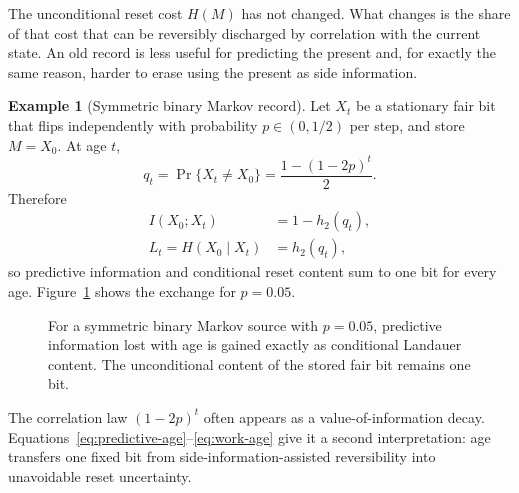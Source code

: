 \documentclass[letterpaper,onecolumn]{IEEEtran}
\theoremstyle{definition}
\newtheorem{example}{Example}
\theoremstyle{remark}
\newcommand{\1}{\mathbf{1}}
\newcommand{\hbin}{h_2}
\begin{document}
The unconditional reset cost $H(M)$ has not changed. What changes is the share
of that cost that can be reversibly discharged by correlation with the current
state. An old record is less useful for predicting the present and, for exactly
the same reason, harder to erase using the present as side information.

\begin{example}[Symmetric binary Markov record]\label{ex:markov}
Let $X_t$ be a stationary fair bit that flips independently with probability
$p\in(0,1/2)$ per step, and store $M=X_0$. At age $t$,
\begin{equation}
 q_t=\Pr\{X_t\ne X_0\}
 =\frac{1-(1-2p)^t}{2}.
 \label{eq:q-age}
\end{equation}
Therefore
\begin{align}
 I(X_0;X_t)&=1-\hbin(q_t),\label{eq:predictive-age}\\
 L_t=H(X_0\mid X_t)&=\hbin(q_t),\label{eq:work-age}
\end{align}
so predictive information and conditional reset content sum to one bit for
every age. Figure~\ref{fig:stale} shows the exchange for $p=0.05$.
\end{example}

\begin{figure}[!t]
\centering
{}
\caption{For a symmetric binary Markov source with $p=0.05$, predictive
information lost with age is gained exactly as conditional Landauer content.
The unconditional content of the stored fair bit remains one bit.}
\label{fig:stale}
\end{figure}

The correlation law $(1-2p)^t$ often appears as a value-of-information decay.
Equations~\eqref{eq:predictive-age}--\eqref{eq:work-age} give it a second
interpretation: age transfers one fixed bit from side-information-assisted
reversibility into unavoidable reset uncertainty.
\end{document}
